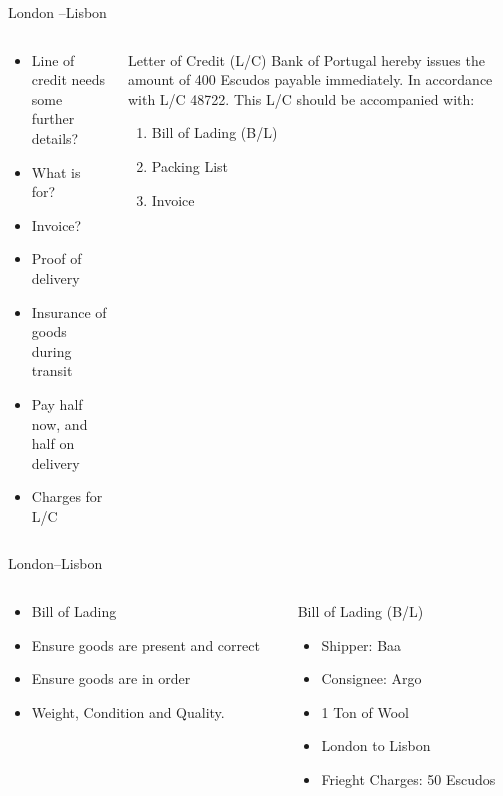 \documentclass[pdf,table]{beamer}
\begin{document}
\begin{frame}{London \---Lisbon}
	\begin{columns}[T]
		\begin{column}{0.48\textwidth}
			\begin{itemize}
				\item Line of credit needs some further details?
				\item What is for?
				\item Invoice?
				\item Proof of delivery
				\item Insurance of goods during transit
				\item Pay half now, and half on delivery
				\item Charges for L/C
			\end{itemize}
		\end{column}
		\begin{column}{0.48\textwidth}
			\begin{block}{Letter of Credit (L/C)}
				Bank of Portugal hereby issues the amount of 400  Escudos payable immediately. In accordance with L/C 48722. This L/C should be accompanied with:
				\begin{enumerate}
					\item Bill of Lading (B/L)
					\item Packing List
					\item Invoice
				\end{enumerate}
				
			\end{block}
		\end{column}
	\end{columns}	
\end{frame}

\begin{frame}{London\---Lisbon}
	\begin{columns}[T]
		\begin{column}{0.48\textwidth}
			\begin{itemize}
				\item Bill of Lading
				\item Ensure goods are present and correct
				\item Ensure goods are in order
				\item Weight, Condition and Quality.
			\end{itemize}
		\end{column}
		\begin{column}{0.48\textwidth}
			\begin{block}{Bill of Lading (B/L)}
				\begin{itemize}
					\item Shipper: Baa
					\item Consignee: Argo
					\item 1 Ton of Wool
					\item London to Lisbon 
					\item Frieght Charges: 50 Escudos 
				\end{itemize}
			\end{block}
		\end{column}
	\end{columns}	
\end{frame}
\end{document}
